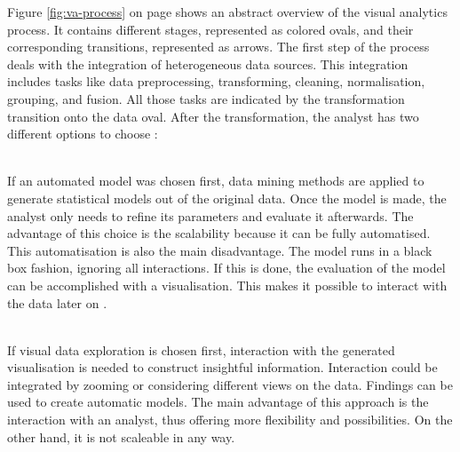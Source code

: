 Figure \ref{fig:va-process} on page \pageref{fig:va-process} shows an abstract overview of the visual analytics process. It contains different stages, represented as colored ovals, and their corresponding transitions, represented as arrows. The first step of the process deals with the integration of heterogeneous data sources. This integration includes tasks like data preprocessing, transforming, cleaning, normalisation, grouping, and fusion. All those tasks are indicated by the transformation transition onto the data oval. After the transformation, the analyst has two different options to choose :
\newpage
\begin{enumerate}
 \hfill \\
If an automated model was chosen first, data mining methods are applied to generate statistical models out of the original data. Once the model is made, the analyst only needs to refine its parameters and evaluate it afterwards. The advantage of this choice is the scalability because it can be fully automatised. This automatisation is also the main disadvantage. The model runs in a black box fashion, ignoring all interactions. If this is done, the evaluation of the model can be accomplished with a visualisation. This makes it possible to interact with the data later on .

 \hfill \\
If visual data exploration is chosen first, interaction with the generated visualisation is needed to construct insightful information. Interaction could be integrated by zooming or considering different views on the data. Findings can be used to create automatic models. The main advantage of this approach is the interaction with an analyst, thus offering more flexibility and possibilities. On the other hand, it is not scaleable in any way.
\end{enumerate}

